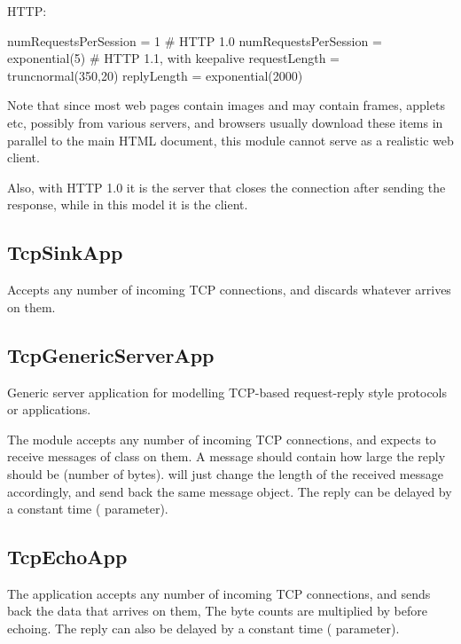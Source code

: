 HTTP:

\begin{inifile}
numRequestsPerSession = 1 # HTTP 1.0
numRequestsPerSession = exponential(5)  # HTTP 1.1, with keepalive
requestLength = truncnormal(350,20)
replyLength = exponential(2000)
\end{inifile}

Note that since most web pages contain images and may contain frames,
applets etc, possibly from various servers, and browsers usually download
these items in parallel to the main HTML document, this module cannot
serve as a realistic web client.

Also, with HTTP 1.0 it is the server that closes the connection after
sending the response, while in this model it is the client.

\subsection{TcpSinkApp}
\label{sec:apps:tcpsinkapp}

Accepts any number of incoming TCP connections, and discards whatever
arrives on them.

\subsection{TcpGenericServerApp}
\label{sec:apps:tcpgenericserverapp}

Generic server application for modelling TCP-based request-reply style
protocols or applications.

The module accepts any number of incoming TCP connections, and expects
to receive messages of class  on them. A message should
contain how large the reply should be (number of bytes). 
will just change the length of the received message accordingly, and send
back the same message object. The reply can be delayed by a constant time
( parameter).

\subsection{TcpEchoApp}
\label{sec:apps:tcpechoapp}

The  application accepts any number of incoming TCP
connections, and sends back the data that arrives on them, The byte counts are
multiplied by  before echoing. The reply can also be delayed by
a constant time ( parameter).

